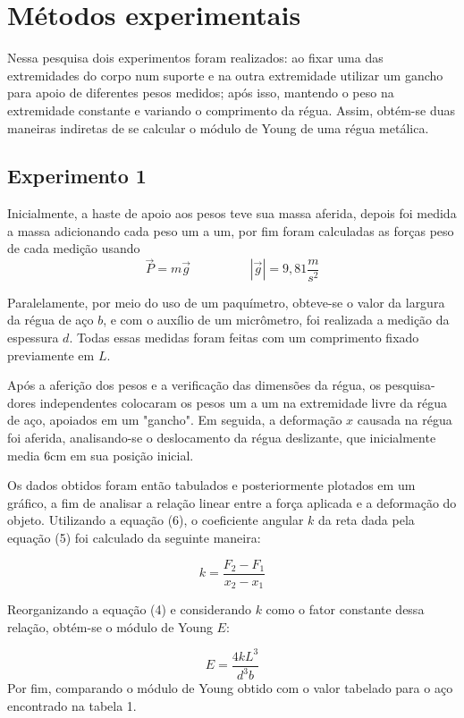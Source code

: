 \documentclass{article}
\begin{document}
\section{Métodos experimentais}
Nessa pesquisa dois experimentos foram realizados: ao fixar uma das extremidades do corpo num suporte e na outra extremidade utilizar um gancho para apoio de diferentes pesos medidos; após isso, mantendo o peso na extremidade constante e variando o comprimento da régua. Assim, obtém-se duas maneiras indiretas de se calcular o módulo de Young de uma régua metálica.

\subsection{Experimento 1}
Inicialmente, a haste de apoio aos pesos teve sua massa aferida, depois foi medida a massa adicionando cada peso um a um, por fim foram calculadas as forças peso de cada medição usando
\begin{equation}
    \vec P = m \vec g \hspace{2cm} |\vec g| = 9,81 \frac{m}{s^2}
\end{equation}

Paralelamente, por meio do uso de um paquímetro, obteve-se o valor da largura da régua de aço $b$, e com o auxílio de um micrômetro, foi realizada a medição da espessura $d$. Todas essas medidas foram feitas com um comprimento fixado previamente em $L$.

Após a aferição dos pesos e a verificação das dimensões da régua, os pesquisa-dores independentes colocaram os pesos um a um na extremidade livre da régua de aço, apoiados em um "gancho". Em seguida, a deformação $x$ causada na régua foi aferida, analisando-se o deslocamento da régua deslizante, que inicialmente media 6cm em sua posição inicial.

Os dados obtidos foram então tabulados e posteriormente plotados em um gráfico, a fim de analisar a relação linear entre a força aplicada e a deformação do objeto. Utilizando a equação (6), o coeficiente angular $k$ da reta dada pela equação (5) foi calculado da seguinte maneira:

\begin{equation}
k = \frac{F_2 - F_1}{x_2 - x_1}
\end{equation}

Reorganizando a equação (4) e considerando $k$ como o fator constante dessa relação, obtém-se o módulo de Young $E$:

\begin{equation}
E = \frac{4kL^3}{d^3b}
\end{equation}
Por fim, comparando o módulo de Young obtido com o valor tabelado para o aço encontrado na tabela 1.
\end{document}
